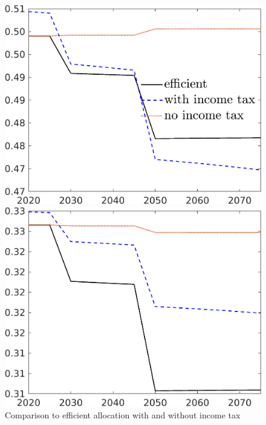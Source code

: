 \begin{figure}[h!!]
	\centering
	\caption{Comparison to efficient allocation with and without income tax }\label{fig:Compno_eff_BN0}
	\begin{minipage}[]{0.32\textwidth}
		\includegraphics[width=1\textwidth]{../../codding_model/own_basedOnFried/optimalPol_elastS_DisuSci/figures/all_1705/hh_CompEffOPT_T_NoTaus_spillover0_sep1_BN0_ineq0_etaa0.79_lgd1.png}
	\end{minipage}
	\begin{minipage}[]{0.32\textwidth}
		\includegraphics[width=1\textwidth]{../../codding_model/own_basedOnFried/optimalPol_elastS_DisuSci/figures/all_1705/hl_CompEffOPT_T_NoTaus_spillover0_sep1_BN0_ineq0_etaa0.79_lgd0.png}

\end{minipage}
\end{figure}
